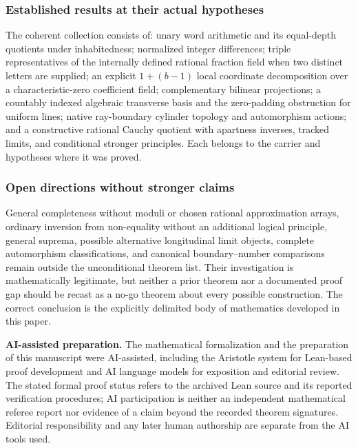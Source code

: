 \documentclass[11pt,reqno]{amsart}
\theoremstyle{definition}\newtheorem{definition}[theorem]{Definition}
\theoremstyle{remark}\newtheorem{remark}[theorem]{Remark}
\begin{document}
\medskip
\subsubsection*{Established results at their actual hypotheses}\label{supp:17-1}
The coherent collection consists of: unary word arithmetic and its equal-depth quotients under inhabitedness; normalized integer differences; triple representatives of the internally defined rational fraction field when two distinct letters are supplied; an explicit $1+(b-1)$ local coordinate decomposition over a characteristic-zero coefficient field; complementary bilinear projections; a countably indexed algebraic transverse basis and the zero-padding obstruction for uniform lines; native ray-boundary cylinder topology and automorphism actions; and a constructive rational Cauchy quotient with apartness inverses, tracked limits, and conditional stronger principles. Each belongs to the carrier and hypotheses where it was proved.
\medskip
\medskip
\subsubsection*{Open directions without stronger claims}\label{supp:17-2}
General completeness without moduli or chosen rational approximation arrays, ordinary inversion from non-equality without an additional logical principle, general suprema, possible alternative longitudinal limit objects, complete automorphism classifications, and canonical boundary--number comparisons remain outside the unconditional theorem list. Their investigation is mathematically legitimate, but neither a prior theorem nor a documented proof gap should be recast as a no-go theorem about every possible construction. The correct conclusion is the explicitly delimited body of mathematics developed in this paper.
\medskip

\par\medskip
\noindent\textbf{AI-assisted preparation.}
The mathematical formalization and the preparation of this manuscript
were AI-assisted, including the Aristotle system for Lean-based proof
development and AI language models for exposition and editorial review.
The stated formal proof status refers to the archived Lean source and its
reported verification procedures; AI participation is neither an
independent mathematical referee report nor evidence of a claim beyond
the recorded theorem signatures. Editorial responsibility and any later
human authorship are separate from the AI tools used.
\end{document}
